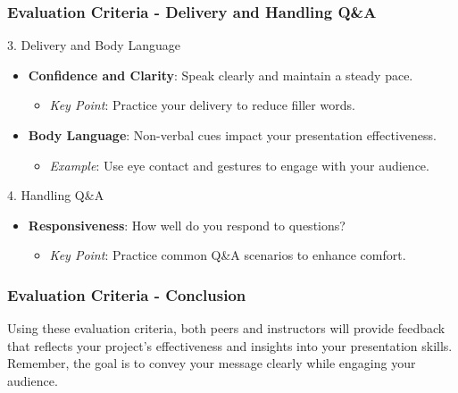 \documentclass{beamer}
\begin{document}
\begin{frame}[fragile]
    \frametitle{Evaluation Criteria - Delivery and Handling Q\&A}
    \begin{block}{3. Delivery and Body Language}
        \begin{itemize}
            \item \textbf{Confidence and Clarity}: Speak clearly and maintain a steady pace.
            \begin{itemize}
                \item \textit{Key Point}: Practice your delivery to reduce filler words.
            \end{itemize}

            \item \textbf{Body Language}: Non-verbal cues impact your presentation effectiveness.
            \begin{itemize}
                \item \textit{Example}: Use eye contact and gestures to engage with your audience.
            \end{itemize}
        \end{itemize}
    \end{block}

    \begin{block}{4. Handling Q\&A}
        \begin{itemize}
            \item \textbf{Responsiveness}: How well do you respond to questions?
            \begin{itemize}
                \item \textit{Key Point}: Practice common Q\&A scenarios to enhance comfort.
            \end{itemize}
        \end{itemize}
    \end{block}
\end{frame}

\begin{frame}[fragile]
    \frametitle{Evaluation Criteria - Conclusion}
    Using these evaluation criteria, both peers and instructors will provide feedback that reflects your project's effectiveness and insights into your presentation skills. 
    Remember, the goal is to convey your message clearly while engaging your audience.
\end{frame}
\end{document}
